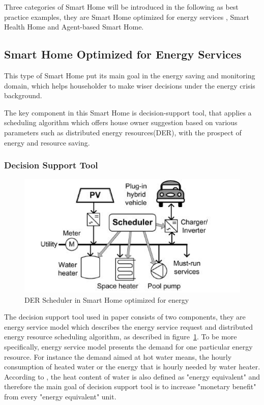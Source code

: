 Three categories of Smart Home will be introduced in the following as best practice examples, they are Smart Home optimized for energy services , Smart Health Home and Agent-based Smart Home.
 
\subsection{Smart Home Optimized for Energy Services}
This type of Smart Home put its main goal in the energy saving and monitoring domain, which helps householder to make wiser decisions under the energy crisis background. 

The key component in this Smart Home is decision-support tool\cite{smart_home_for_energy}, that applies a scheduling algorithm which offers house owner suggestion based on various parameters such as distributed energy resources(DER), with the prospect of energy and resource saving.

\subsubsection{Decision Support Tool}

 \begin{figure}[!htbp]
	\centering
	\includegraphics[width=1.0\textwidth]{scheduler.jpg}
		\caption{DER Scheduler in Smart Home optimized for energy\cite{smart_home_for_energy}}
	\label{fig:smart-home-scheduler}
\end{figure}

The decision support tool used in paper\cite{smart_home_for_energy} consists of two components, they are energy service model which describes the energy service request and distributed energy resource scheduling algorithm, as described in figure~\ref{fig:smart-home-scheduler}. To be more specifically, energy service model presents the demand for one particular energy resource. For instance the demand aimed at hot water means, the hourly consumption of heated water or the energy that is hourly needed by water heater.  According to \cite{smart_home_for_energy}, the heat content of water is also defined as "energy equivalent" and therefore the main goal of decision support tool is to increase "monetary benefit"  from every "energy equivalent" unit.

